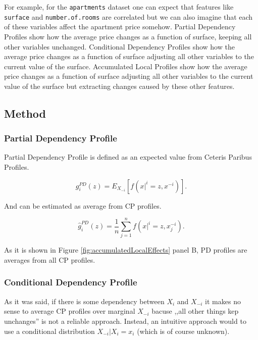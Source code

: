 \documentclass[12pt,]{krantz}
\begin{document}
For example, for the \texttt{apartments} dataset one can expect that features like \texttt{surface} and \texttt{number.of.rooms} are correlated but we can also imagine that each of these variables affect the apartment price somehow. Partial Dependency Profiles show how the average price changes as a function of surface, keeping all other variables unchanged. Conditional Dependency Profiles show how the average price changes as a function of surface adjusting all other variables to the current value of the surface. Accumulated Local Profiles show how the average price changes as a function of surface adjusting all other variables to the current value of the surface but extracting changes caused by these other features.

\hypertarget{ALPMethod}{%
\subsection{Method}\label{ALPMethod}}

\hypertarget{partial-dependency-profile}{%
\subsubsection{Partial Dependency Profile}\label{partial-dependency-profile}}

Partial Dependency Profile is defined as an expected value from Ceteris Paribus Profiles.

\begin{equation}
g^{PD}_i(z) = E_{X_{-i}}[ f(x|^i = z, x^{-i}) ].
\label{eq:PDPdef}
\end{equation}

And can be estimated as average from CP profiles.

\begin{equation}
\hat g^{PD}_i(z) = \frac{1}{n} \sum_{j=1}^{n} f(x|^i = z, x_j^{-i}).
\label{eq:PDPest}
\end{equation}

As it is shown in Figure \ref{fig:accumulatedLocalEffects} panel B, PD profiles are averages from all CP profiles.

\hypertarget{conditional-dependency-profile}{%
\subsubsection{Conditional Dependency Profile}\label{conditional-dependency-profile}}

As it was said, if there is some dependency between \(X_i\) and \(X_{-i}\) it makes no sense to average CP profiles over marginal \(X_{-i}\) bacuse ,,all other things kep unchanges'' is not a reliable approach.
Instead, an intuitive approach would to use a conditional distribution \(X_{-i}|X_i=x_i\) (which is of course unknown).
\end{document}
